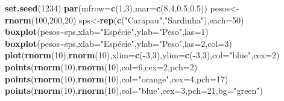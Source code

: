 \documentclass[
]{article}
\newenvironment{Shaded}{\begin{snugshade}}{\end{snugshade}}
\newcommand{\AttributeTok}[1]{\textcolor[rgb]{0.13,0.29,0.53}{#1}}
\newcommand{\DecValTok}[1]{\textcolor[rgb]{0.00,0.00,0.81}{#1}}
\newcommand{\FloatTok}[1]{\textcolor[rgb]{0.00,0.00,0.81}{#1}}
\newcommand{\FunctionTok}[1]{\textcolor[rgb]{0.13,0.29,0.53}{\textbf{#1}}}
\newcommand{\NormalTok}[1]{#1}
\newcommand{\OtherTok}[1]{\textcolor[rgb]{0.56,0.35,0.01}{#1}}
\newcommand{\SpecialCharTok}[1]{\textcolor[rgb]{0.81,0.36,0.00}{\textbf{#1}}}
\newcommand{\StringTok}[1]{\textcolor[rgb]{0.31,0.60,0.02}{#1}}
\begin{document}
\begin{Shaded}
\begin{Highlighting}[]
\FunctionTok{set.seed}\NormalTok{(}\DecValTok{1234}\NormalTok{)}
\FunctionTok{par}\NormalTok{(}\AttributeTok{mfrow=}\FunctionTok{c}\NormalTok{(}\DecValTok{1}\NormalTok{,}\DecValTok{3}\NormalTok{),}\AttributeTok{mar=}\FunctionTok{c}\NormalTok{(}\DecValTok{8}\NormalTok{,}\DecValTok{4}\NormalTok{,}\FloatTok{0.5}\NormalTok{,}\FloatTok{0.5}\NormalTok{))}
\NormalTok{pesos}\OtherTok{\textless{}{-}}\FunctionTok{rnorm}\NormalTok{(}\DecValTok{100}\NormalTok{,}\DecValTok{200}\NormalTok{,}\DecValTok{20}\NormalTok{)}
\NormalTok{sps}\OtherTok{\textless{}{-}}\FunctionTok{rep}\NormalTok{(}\FunctionTok{c}\NormalTok{(}\StringTok{"Carapau"}\NormalTok{,}\StringTok{"Sardinha"}\NormalTok{),}\AttributeTok{each=}\DecValTok{50}\NormalTok{)}
\FunctionTok{boxplot}\NormalTok{(pesos}\SpecialCharTok{\textasciitilde{}}\NormalTok{sps,}\AttributeTok{xlab=}\StringTok{"Espécie"}\NormalTok{,}\AttributeTok{ylab=}\StringTok{"Peso"}\NormalTok{,}\AttributeTok{las=}\DecValTok{1}\NormalTok{)}
\FunctionTok{boxplot}\NormalTok{(pesos}\SpecialCharTok{\textasciitilde{}}\NormalTok{sps,}\AttributeTok{xlab=}\StringTok{"Espécie"}\NormalTok{,}\AttributeTok{ylab=}\StringTok{"Peso"}\NormalTok{,}\AttributeTok{las=}\DecValTok{2}\NormalTok{,}\AttributeTok{col=}\DecValTok{3}\NormalTok{)}
\FunctionTok{plot}\NormalTok{(}\FunctionTok{rnorm}\NormalTok{(}\DecValTok{10}\NormalTok{),}\FunctionTok{rnorm}\NormalTok{(}\DecValTok{10}\NormalTok{),}\AttributeTok{xlim=}\FunctionTok{c}\NormalTok{(}\SpecialCharTok{{-}}\DecValTok{3}\NormalTok{,}\DecValTok{3}\NormalTok{),}\AttributeTok{ylim=}\FunctionTok{c}\NormalTok{(}\SpecialCharTok{{-}}\DecValTok{3}\NormalTok{,}\DecValTok{3}\NormalTok{),}\AttributeTok{col=}\StringTok{"blue"}\NormalTok{,}\AttributeTok{cex=}\DecValTok{2}\NormalTok{)}
\FunctionTok{points}\NormalTok{(}\FunctionTok{rnorm}\NormalTok{(}\DecValTok{10}\NormalTok{),}\FunctionTok{rnorm}\NormalTok{(}\DecValTok{10}\NormalTok{),}\AttributeTok{col=}\DecValTok{6}\NormalTok{,}\AttributeTok{cex=}\DecValTok{2}\NormalTok{,}\AttributeTok{pch=}\DecValTok{2}\NormalTok{)}
\FunctionTok{points}\NormalTok{(}\FunctionTok{rnorm}\NormalTok{(}\DecValTok{10}\NormalTok{),}\FunctionTok{rnorm}\NormalTok{(}\DecValTok{10}\NormalTok{),}\AttributeTok{col=}\StringTok{"orange"}\NormalTok{,}\AttributeTok{cex=}\DecValTok{4}\NormalTok{,}\AttributeTok{pch=}\DecValTok{17}\NormalTok{)}
\FunctionTok{points}\NormalTok{(}\FunctionTok{rnorm}\NormalTok{(}\DecValTok{10}\NormalTok{),}\FunctionTok{rnorm}\NormalTok{(}\DecValTok{10}\NormalTok{),}\AttributeTok{col=}\StringTok{"blue"}\NormalTok{,}\AttributeTok{cex=}\DecValTok{3}\NormalTok{,}\AttributeTok{pch=}\DecValTok{21}\NormalTok{,}\AttributeTok{bg=}\StringTok{"green"}\NormalTok{)}
\end{Highlighting}
\end{Shaded}
\end{document}
